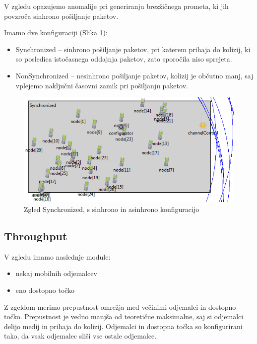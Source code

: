 \documentclass[a4paper,11pt]{article}
\begin{document}
V zgledu opazujemo anomalije pri generiranju brezžičnega prometa, ki jih povzroča sinhrono pošiljanje paketov.

Imamo dve konfiguraciji (Slika \ref{image:synchronized}):
\begin{itemize}
    \item Synchronized – sinhrono pošiljanje paketov, pri katerem prihaja do kolizij, ki so posledica istočasnega oddajnja paketov, zato sporočila niso sprejeta.
    \item NonSynchronized – nesinhrono pošiljanje paketov, kolizij je občutno manj, saj vplejemo naključni časovni zamik pri pošiljanju paketov.
\end{itemize}


\begin{figure}[htbp]
    \begin{center}
        \includegraphics[scale=0.8]{img/zgledi/synchronized_sync.png}
        \caption{Zgled Synchronized, s sinhrono in asinhrono konfiguracijo}
	\label{image:synchronized}
    \end{center}
\end{figure}




\subsection{Throughput}

V zgledu imamo naslednje module:
\begin{itemize}
    \item nekaj mobilnih odjemalcev
    \item eno dostopno točko
\end{itemize}

Z zgeldom merimo prepustnost omrežja med večinimi odjemalci in dostopno točko. Prepustnost je vedno manjša od teoretične maksimalne, saj si odjemalci delijo medij in prihaja do kolizij. Odjemalci in dostopna točka so konfigurirani tako, da vsak odjemalec sliši vse ostale odjemalce.\\
\end{document}
